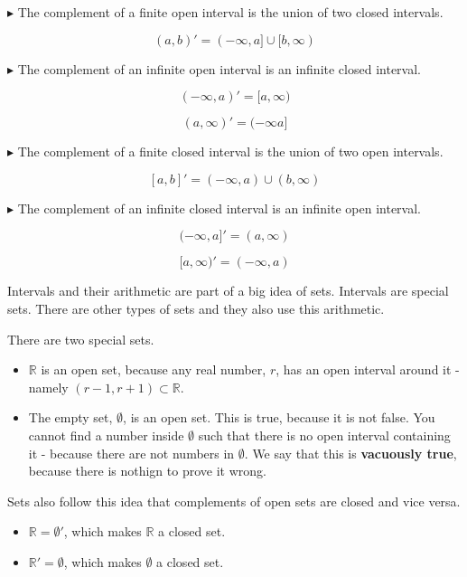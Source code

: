 \documentclass{ximera}
\begin{document}
$\blacktriangleright$ The complement of a finite open interval is the union of two closed intervals.

\[    (a,b)'  = (-\infty, a] \cup [b, \infty)          \]



$\blacktriangleright$ The complement of an infinite open interval is an infinite closed interval.

\[     (-\infty, a)' = [a, \infty)          \]

\[     (a, \infty)' = (-\infty a]          \]



$\blacktriangleright$ The complement of a finite closed interval is the union of two open intervals.

\[    [a,b]'  = (-\infty, a) \cup (b, \infty)          \]



$\blacktriangleright$ The complement of an infinite closed interval is an infinite open interval.

\[     (-\infty, a]' = (a, \infty)          \]

\[     [a, \infty)' = (-\infty, a)          \]









Intervals and their arithmetic are part of a big idea of sets.  Intervals are special sets.  There are other types of sets and they also use this arithmetic.

There are two special sets.

\begin{itemize}
\item $\mathbb{R}$  is an open set, because any real number, $r$, has an open interval around it - namely $(r-1, r+1) \subset \mathbb{R}$.
\item The empty set, $\emptyset$, is an open set.  This is true, because it is not false.  You cannot find a number inside $\emptyset$ such that there is no open interval containing it - because there are not numbers in $\emptyset$.  We say that this is \textbf{vacuously true}, because there is nothign to prove it wrong.
\end{itemize}





Sets also follow this idea that complements of open sets are closed and vice versa.

\begin{itemize}
\item $\mathbb{R} = \emptyset'$, which makes $\mathbb{R}$ a closed set.
\item $\mathbb{R}' = \emptyset$, which makes $\emptyset$ a closed set.
\end{itemize}
\end{document}
